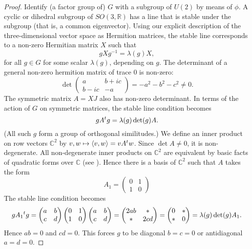 \documentclass{amsart}
\newcommand{\ring}[1]{\mathbb{#1}}
\def\t#1{\hbox{}^t#1}
\begin{document}
\begin{proof} Identify (a factor group of) $G$ with a subgroup of
  $U(2)$ by means of $\phi$.  A cyclic or dihedral subgroup of
  $SO(3,\ring{R})$ has a line that is stable under the subgroup (that
  is, a common eigenvector). Using our explicit description of the
  three-dimensional vector space as Hermition matrices, the stable
  line corresponds to a non-zero Hermitian matrix $X$ such that
\[
g X g^{-1} = \lambda(g) X,
\]
for all $g\in G$ for some scalar $\lambda(g)$, depending on $g$.
The determinant of a general non-zero hermition matrix of trace $0$ is non-zero:
\[
\det\begin{pmatrix} a & b + i c\\ b - i c & -a\end{pmatrix} = -a^2 - b^2 - c^2 \ne 0.
\]
The symmetric matrix $A = X J$ also has non-zero determinant.  In
terms of the action of $G$ on symmetric matrices, the stable line
condition becomes
\[
g A \t{g} = \lambda(g)\det(g) A.
\]
(All such $g$ form a group of orthogonal similitudes.)  We define an
inner product on row vectors $\ring{C}^2$ by $v,w\mapsto \langle
v,w\rangle = v A \t{w}$.  Since $\det A\ne 0$, it is non-degenerate.
All non-degenerate inner products on $\ring{C}^2$ are equivalent by
basic facts of quadratic forms over $\ring{C}$ (see \cite{knapp-basic}).  Hence there is a
basis of $\ring{C}^2$ such that $A$ takes the form
\[
A_1 = \begin{pmatrix} 0 & 1 \\ 1 & 0\end{pmatrix}
\]
The stable line condition becomes
\begin{equation}
g A_1 \t{g}=\begin{pmatrix} a & b \\ c & d\end{pmatrix} 
\begin{pmatrix} 0 & 1 \\ 1 & 0\end{pmatrix}
\begin{pmatrix} a & b \\ c & d\end{pmatrix} = 
\begin{pmatrix} 2 a b & * \\ * & 2 c d\end{pmatrix} =
\begin{pmatrix} 0 & * \\ * & 0\end{pmatrix} = \lambda(g)\det(g) A_1.
\end{equation}
Hence $ab=0$ and $cd=0$.  This forces $g$ to be diagonal $b=c=0$ or
antidiagonal $a=d=0$.  


\end{proof}
\end{document}
